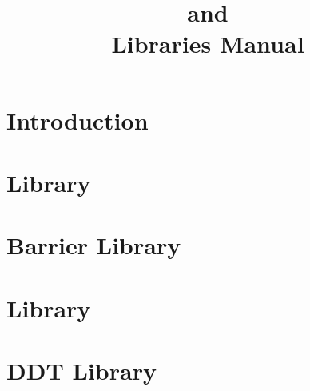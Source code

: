 \documentclass[10pt]{report}
\title{\converse{} and \charmpp{}\\ Libraries Manual}
\begin{document}
\maketitle

\chapter{Introduction}

\chapter{\irecv{} Library}

\chapter{Barrier Library}

\chapter{\tempo{} Library}

\chapter{DDT Library}



\end{document}
